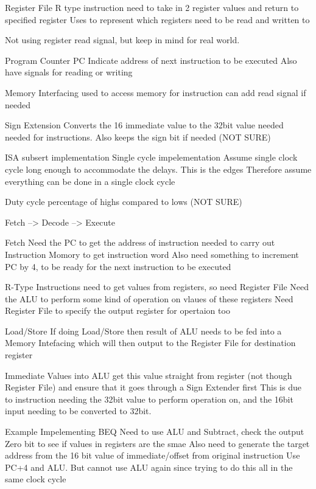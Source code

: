 \documentclass{article}
\begin{document}
		Register File
			R type instruction need to take in 2 register values and return to specified register
			Uses to represent which registers need to be read and written to

			Not using register read signal, but keep in mind for real world.

		Program Counter PC
			Indicate address of next instruction to be executed
			Also have signals for reading or writing

		Memory Interfacing
			used to access memory for instruction
			can add read signal if needed

		Sign Extension
			Converts the 16 immediate value to the 32bit value needed needed for instructions. Also keeps the sign bit if needed (NOT SURE)

	ISA subsert implementation
		Single cycle impelementation
			Assume single clock cycle long enough to accommodate the delays. This is the edges
			Therefore assume everything can be done in a single clock cycle

			Duty cycle
				percentage of highs compared to lows (NOT SURE)

		Fetch --> Decode --> Execute

		Fetch
			Need the PC to get the address of instruction needed to carry out
			Instruction Momory to get instruction word
			Also need something to increment PC by 4, to be ready for the next instruction to be executed

		R-Type Instructions
			need to get values from registers, so need Register File
			Need the ALU to perform some kind of operation on vlaues of these registers 
			Need Register File to specify the output register for opertaion too

		Load/Store
			If doing Load/Store then result of ALU needs to be fed into a Memory Intefacing which will then output to the Register File for destination register

		Immediate Values into ALU
			get this value straight from register (not though Register File) and ensure that it goes through a Sign Extender first
			This is due to instruction needing the 32bit value to perform operation on, and the 16bit input needing to be converted to 32bit.


	Example
		Impelementing BEQ
			Need to use ALU and Subtract, check the output Zero bit to see if values in registers are the smae
			Also need to generate the target address from the 16 bit value of immediate/offset from original instruction
				Use PC+4 and ALU. But cannot use ALU again since trying to do this all in the same clock cycle
\end{document}
